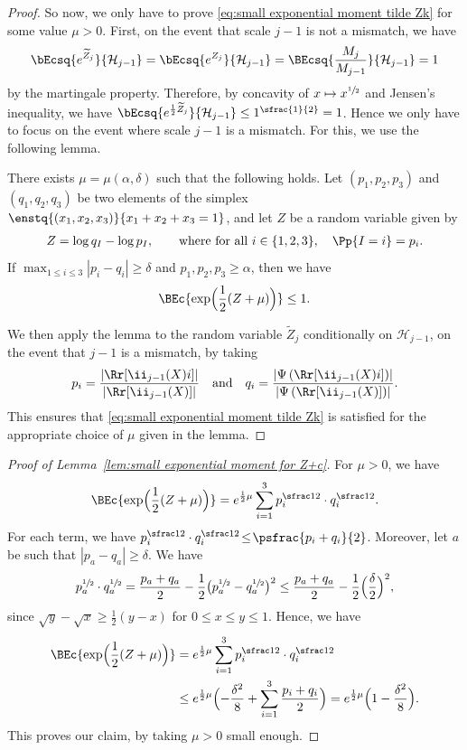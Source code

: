\begin{proof}
So now, we only have to prove \eqref{eq:small exponential moment tilde Zk} for some value $\mu>0$.
First, on the event that scale $j-1$ is not a mismatch, we have
\begin{align*}
\bEcsq{e^{\widetilde Z_j}}{\mathcal H_{j-1}}= \bEcsq{e^{Z_j}}{\mathcal H_{j-1}}= \BEcsq{\frac{M_j}{M_{j-1}}}{\mathcal H_{j-1}}=1
\end{align*}
by the martingale property. Therefore, by concavity of $x\mapsto x^{\sfrac{1}{2}}$ and Jensen's inequality, we have $\bEcsq{e^{\frac12 \widetilde Z_j}}{\mathcal H_{j-1}}\leq 1^{\sfrac{1}{2}} =1$.
Hence we only have to focus on the event where scale $j-1$ is a mismatch.
For this, we use the following lemma.
\begin{lemma}\label{lem:small exponential moment for Z+c}
There exists $\mu=\mu(\alpha,\delta)$ such that the following holds.
Let $(p_1,p_2,p_3)$ and $(q_1,q_2,q_3)$ be two elements of the simplex $\enstq{(x_1,x_2,x_3)}{x_1+x_2+x_3=1}$, and let $Z$ be a random variable given by
\begin{align*}
Z= \log q_I - \log p_I,\qquad \text{where for all } i\in \{1,2,3\}, \quad \Pp{I=i}=p_i.
\end{align*}
If $\max_{1 \leq i \leq 3}|p_i-q_i| \geq \delta$ and $p_1,p_2,p_3\geq \alpha$,
then we have
\begin{align}
\BEc{\exp\Bigl(\frac{1}{2} (Z + \mu )\Bigr)}\leq 1.
\end{align}
\end{lemma}
We then apply the lemma to the random variable $\widetilde{Z}_j$ conditionally on $\mathcal{H}_{j-1}$, on the event that $j-1$ is a mismatch, by taking
\[
p_i= \frac{\left| \Rr[\ii_{j-1}(X)i] \right|}{\left| \Rr[\ii_{j-1}(X)] \right|}\quad\text{and}\quad q_i= \frac{\left| \Psi \left( \Rr[\ii_{j-1}(X)i] \right) \right|}{\left| \Psi \left( \Rr[\ii_{j-1}(X)] \right) \right|}.
\]
This ensures that \eqref{eq:small exponential moment tilde Zk} is satisfied for the appropriate choice of $\mu$ given in the lemma.
\end{proof}

\begin{proof}[Proof of Lemma~\ref{lem:small exponential moment for Z+c}]
For $\mu>0$, we have
\[ \BEc{\exp \Bigl( \frac12(Z+\mu)\Bigr)} = e^{\frac12 \mu} \sum_{i=1}^3 p_i^{\sfrac12}\cdot q_i^{\sfrac12}. \]
For each term, we have $p_i^{\sfrac12} \cdot q_i^{\sfrac12}\!\leq\! \psfrac{p_i+q_i}{2}$. Moreover, let $a$ be such that $|p_a-q_a|\!\geq\! \delta$. We have
\[ p_a^{\sfrac12} \cdot q_a^{\sfrac12} = \frac{p_a+q_a}{2} - \frac{1}{2} \bigl( p_a^{\sfrac12}-q_a^{\sfrac12} \bigr)^2 \leq \frac{p_a+q_a}{2} - \frac{1}{2} \Bigl( \frac{\delta}{2} \Bigr)^2,\]
since $\sqrt{y}-\sqrt{x} \geq \frac{1}{2}(y-x)$ for $0 \leq x \leq y \leq 1$. Hence, we have
\begin{align*}
\BEc{\exp \Bigl( \frac12(Z+\mu) \Bigr)} &= e^{\frac12 \mu} \sum_{i=1}^3 p_i^{\sfrac12} \cdot q_i^{\sfrac12}\\
& \leq e^{\frac12 \mu} \Bigl( -\frac{\delta^2}{8} + \sum_{i=1}^3 \frac{p_i+q_i}{2} \Bigr)= e^{\frac12 \mu} \Bigl( 1-\frac{\delta^2}{8} \Bigr).
\end{align*}
This proves our claim, by taking $\mu>0$ small enough.
\end{proof}

